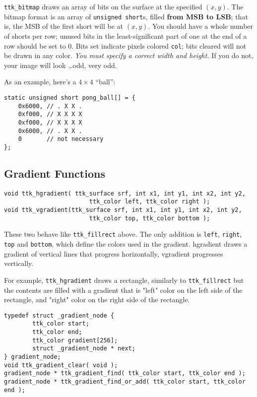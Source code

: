 \documentclass[12pt,letterpaper]{report}
\let\ttt\tt
\def\tt{\def\_{{\ttt\char`\_}}\ttt}
\begin{document}
\verb|ttk_bitmap| draws an array of bits on the surface at the specified $(x,y)$. The bitmap format
is an array of \verb|unsigned short|s, filled {\bf from MSB to LSB}; that is, the MSB of the first
short will be at $(x,y)$. You should have a whole number of shorts per row; unused bits in the least-significant
part of one at the end of a row should be set to 0.
Bits set indicate pixels colored \verb|col|; bits cleared will not be
drawn in any color. {\it You must specify a correct width and height.} If you do not, your image will
look \ldots odd, very odd.

As an example, here's a $4\times4$ ``ball'':
\begin{verbatim}
static unsigned short pong_ball[] = {
    0x6000, // . X X .
    0xf000, // X X X X
    0xf000, // X X X X
    0x6000, // . X X .
    0       // not necessary
};
\end{verbatim}

\subsection{Gradient Functions}
\begin{verbatim}
void ttk_hgradient( ttk_surface srf, int x1, int y1, int x2, int y2,
                        ttk_color left, ttk_color right );
void ttk_vgradient(ttk_surface srf, int x1, int y1, int x2, int y2,
                        ttk_color top, ttk_color bottom );
\end{verbatim}

These two behave like {\tt ttk_fillrect} above.  The only addition is 
{\tt left}, {\tt right}, {\tt top} and {\tt bottom}, which define the 
colors used in the gradient.  hgradient draws a gradient of vertical lines
that progress horizontally, vgradient progresses vertically.

For example, {\tt ttk_hgradient} draws a rectangle, similarly to
{\tt ttk_fillrect} but the contents are filled with a gradient that
is "left" color on the left side of the rectangle, and "right" color
on the right side of the rectangle.


\begin{verbatim}
typedef struct _gradient_node {
        ttk_color start;
        ttk_color end;
        ttk_color gradient[256];
        struct _gradient_node * next;
} gradient_node;
void ttk_gradient_clear( void );
gradient_node * ttk_gradient_find( ttk_color start, ttk_color end );
gradient_node * ttk_gradient_find_or_add( ttk_color start, ttk_color end );
\end{verbatim}
\end{document}
